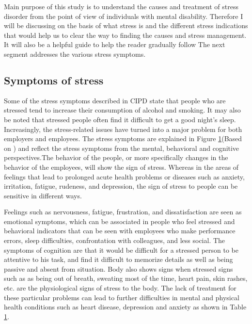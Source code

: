Main purpose of this study is to understand the causes and treatment of stress disorder from the point of view of individuals with mental disability. Therefore I will be discussing on the basis of what stress is and the different stress indications that would help us to clear the way to finding the causes and stress management.  It will also be a helpful guide to help the reader gradually follow The next segment addresses the various stress symptoms.

\subsection{Symptoms of stress}
Some of the stress symptoms described in \acs{CIPD} state that people who are stressed tend to increase their consumption of alcohol and smoking. It may also be noted that stressed people often find it difficult to get a good night's sleep.  Increasingly, the stress-related issues have turned into a major problem for both employers and employees. The stress symptoms are explained in Figure \ref{fig:symptom}(Based on \cite{MayoClinic2018Post-traumaticCauses}) and reflect the stress symptoms from the mental, behavioral and cognitive perspectives.The behavior of the people, or more specifically changes in the behavior of the employees, will show the sign of stress. Whereas in the areas of feelings that lead to prolonged acute health problems or diseases such as anxiety, irritation, fatigue, rudeness, and depression, the sign of stress to people can be sensitive in different ways.

\begin{figure}[ht!]
\centering
{}
  \label{fig:symptom}
\end{figure}

Feelings such as nervousness, fatigue, frustration, and dissatisfaction are seen as emotional symptoms, which can be associated in people who feel stressed and behavioral indicators that can be seen with employees who make performance errors, sleep difficulties, confrontation with colleagues, and less social. 
The symptoms of cognition are that it would be difficult for a stressed person to be attentive to his task, and find it difficult to memorize details as well as being passive and absent from situation.
Body also shows signs when stressed signs such as as being out of breath, sweating most of the time, heart pain, skin rashes, etc. are the physiological signs of stress to the body. The lack of treatment for these particular problems can lead to further difficulties in mental and physical health conditions such as heart disease, depression and anxiety as shown in Table \ref{fig:symptom}.


